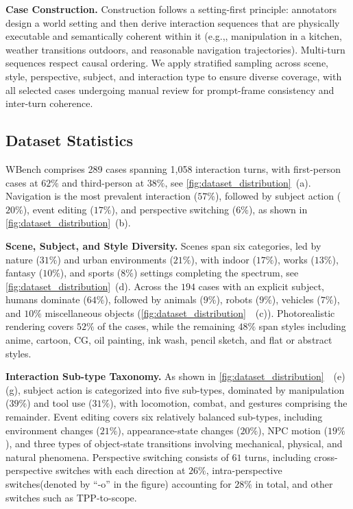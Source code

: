 \documentclass{llmxive}
\providecommand{\eg}{e.g.,\xspace}
\providecommand{\myparagraph}[1]{\vspace{-0.1em}\noindent\textbf{#1}\hspace{0.3em}}
\providecommand{\numvideo}{289\xspace}
\providecommand{\numturn}{1,058\xspace}
\providecommand{\benchmark}{WBench }
\begin{document}
\myparagraph{Case Construction.}
Construction follows a setting-first principle: annotators design a world setting and then derive interaction sequences that are physically executable and semantically coherent within it (\eg, manipulation in a kitchen, weather transitions outdoors, and reasonable navigation trajectories). Multi-turn sequences respect causal ordering. We apply stratified sampling across scene, style, perspective, subject, and interaction type to ensure diverse coverage, with all selected cases undergoing manual review for prompt-frame consistency and inter-turn coherence.

\subsection{Dataset Statistics}
\label{sec:statistics}


\benchmark comprises \numvideo cases spanning \numturn interaction turns, with first-person cases at $62\%$ and third-person at $38\%$, see \cref{fig:dataset_distribution}~\!(a). Navigation is the most prevalent interaction ($57\%$), followed by subject action ($20\%$), event editing ($17\%$), and perspective switching ($6\%$), as shown in \cref{fig:dataset_distribution}~\!(b).

\myparagraph{Scene, Subject, and Style Diversity.} Scenes span six categories, led by nature ($31\%$) and urban environments ($21\%$), with indoor ($17\%$), works ($13\%$), fantasy ($10\%$), and sports ($8\%$) settings completing the spectrum, see \cref{fig:dataset_distribution}~\!(d). Across the $194$ cases with an explicit subject, humans dominate ($64\%$), followed by animals ($9\%$), robots ($9\%$), vehicles ($7\%$), and $10\%$ miscellaneous objects (\cref{fig:dataset_distribution}~~(c)). Photorealistic rendering covers $52\%$ of the cases, while the remaining $48\%$ span styles including anime, cartoon, CG, oil painting, ink wash, pencil sketch, and flat or abstract styles.

\myparagraph{Interaction Sub-type Taxonomy.}
As shown in \cref{fig:dataset_distribution}~~(e)(g), subject action is categorized into five sub-types, dominated by manipulation ($39\%$) and tool use ($31\%$), with locomotion, combat, and gestures comprising the remainder. Event editing covers six relatively balanced sub-types, including environment changes ($21\%$), appearance-state changes ($20\%$), NPC motion ($19\%$), and three types of object-state transitions involving mechanical, physical, and natural phenomena. Perspective switching consists of $61$ turns, including cross-perspective switches with each direction at $26\%$, intra-perspective switches(denoted by ``-o'' in the figure) accounting for $28\%$ in total, and other switches such as TPP-to-scope.
\end{document}
